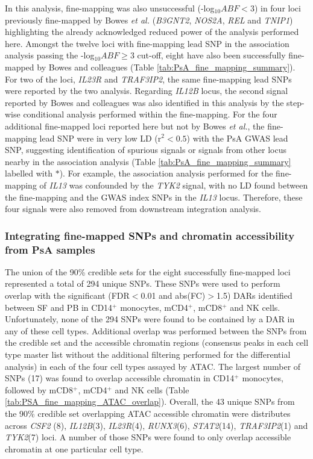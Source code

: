 In this analysis, fine-mapping was also unsuccessful (-log${_10}ABF<3$) in four loci previously fine-mapped by Bowes \textit{et al.} (\textit{B3GNT2}, \textit{NOS2A}, \textit{REL} and \textit{TNIP1}) highlighting the already acknowledged reduced power of the analysis performed here. Amongst the twelve loci with fine-mapping lead SNP in the association analysis passing the -log${_10}ABF\geq3$ cut-off, eight have also been successfully fine-mapped by Bowes and colleagues (Table \ref{tab:PsA_fine_mapping_summary}). For two of the loci, \textit{IL23R} and \textit{TRAF3IP2}, the same fine-mapping lead SNPs were reported by the two analysis. Regarding \textit{IL12B} locus, the second signal reported by Bowes and colleagues was also identified in this analysis by the step-wise conditional analysis performed within the fine-mapping. For the four additional fine-mapped loci reported here but not by Bowes \textit{et al.}, the fine-mapping lead SNP were in very low LD (r${^2}<0.5$) with the PsA GWAS lead SNP, suggesting identification of spurious signals or signals from other locus nearby in the association analysis (Table \ref{tab:PsA_fine_mapping_summary} labelled with $\ast$). For example, the association analysis performed for the fine-mapping of \textit{IL13} was confounded by the \textit{TYK2} signal, with no LD found between the fine-mapping and the GWAS index SNPs in the \textit{IL13} locus. Therefore, these four signals were also removed from downstream integration analysis.




\subsubsection{Integrating fine-mapped SNPs and chromatin accessibility from PsA samples}
The union of the 90\% credible sets for the eight successfully fine-mapped loci represented a total of 294 unique SNPs. These SNPs were used to perform overlap with the significant (FDR$<$0.01 and abs(FC)$>$1.5) DARs identified between SF and PB in CD14$^+$ monocytes, mCD4$^+$, mCD8$^+$ and NK cells. Unfortunately, none of the 294 SNPs were found to be contained by a DAR in any of these cell types. Additional overlap was performed between the SNPs from the credible set and the accessible chromatin regions (consensus peaks in each cell type master list without the additional filtering performed for the differential analysis) in each of the four cell types assayed by ATAC. The largest number of SNPs (17) was found to overlap accessible chromatin in CD14$^+$ monocytes, followed by mCD8$^+$, mCD4$^+$ and NK cells (Table \ref{tab:PSA_fine_mapping_ATAC_overlap}). Overall, the 43 unique SNPs from the 90\% credible set overlapping ATAC accessible chromatin were distributes across \textit{CSF2} (8), \textit{IL12B}(3), \textit{IL23R}(4), \textit{RUNX3}(6), \textit{STAT2}(14), \textit{TRAF3IP2}(1) and \textit{TYK2}(7) loci. A number of those SNPs were found to only overlap accessible chromatin at one particular cell type. 


